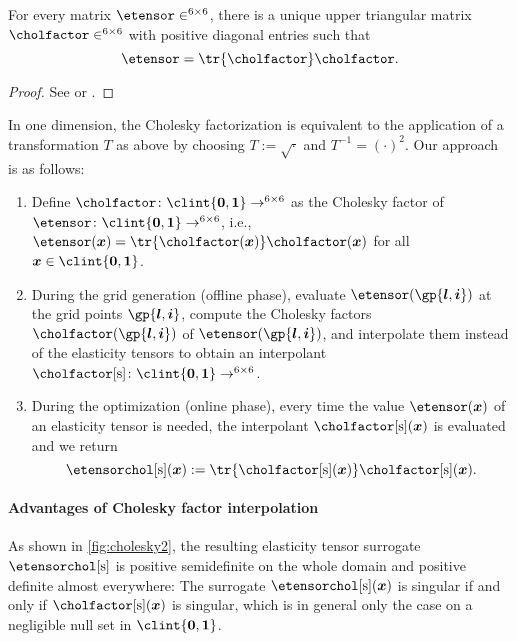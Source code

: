 \begin{proposition}
  For every \spd matrix $\etensor \in \real^{6 \times 6}$,
  there is a unique upper triangular matrix
  $\cholfactor \in \real^{6 \times 6}$
  with positive diagonal entries such that
  \begin{equation}
    \etensor
    = \tr{\cholfactor} \cholfactor.
  \end{equation}
\end{proposition}

\begin{proof}
  See \cite{Benoit24Note} or \cite{Freund07Stoer}.
\end{proof}

In one dimension, the Cholesky factorization is equivalent
to the application of a transformation $T$ as above by choosing
$T := \sqrt{\cdot}$ and $T^{-1} = (\cdot)^2$.
Our approach is as follows:
\begin{enumerate}
  \item
  Define $\cholfactor\colon \clint{\*0, \*1} \to \real^{6 \times 6}$
  as the Cholesky factor of
  $\etensor\colon \clint{\*0, \*1} \to \real^{6 \times 6}$, i.e.,
  $\etensor(\*x) = \tr{\cholfactor(\*x)} \cholfactor(\*x)$
  for all $\*x \in \clint{\*0, \*1}$.
  
  \item
  During the grid generation (offline phase),
  evaluate $\etensor(\gp{\*l,\*i})$ at the grid points $\gp{\*l,\*i}$,
  compute the Cholesky factors $\cholfactor(\gp{\*l,\*i})$ of
  $\etensor(\gp{\*l,\*i})$,
  and interpolate them instead of the elasticity tensors
  to obtain an interpolant
  $\cholfactorintp\colon \clint{\*0, \*1} \to \real^{6 \times 6}$.
  
  \item
  During the optimization (online phase),
  every time the value $\etensor(\*x)$ of an elasticity tensor is needed,
  the interpolant $\cholfactorintp(\*x)$ is evaluated and we return
  \begin{equation}
    \etensorcholintp(\*x)
    := \tr{\cholfactorintp(\*x)} \cholfactorintp(\*x).
  \end{equation}
\end{enumerate}

\paragraph{Advantages of Cholesky factor interpolation}

As shown in \cref{fig:cholesky2},
the resulting elasticity tensor surrogate $\etensorcholintp$
is positive semidefinite on the whole domain and
positive definite almost everywhere:
The surrogate $\etensorcholintp(\*x)$ is singular if and only if
$\cholfactorintp(\*x)$ is singular, which is in general
only the case on a negligible null set in $\clint{\*0, \*1}$.

